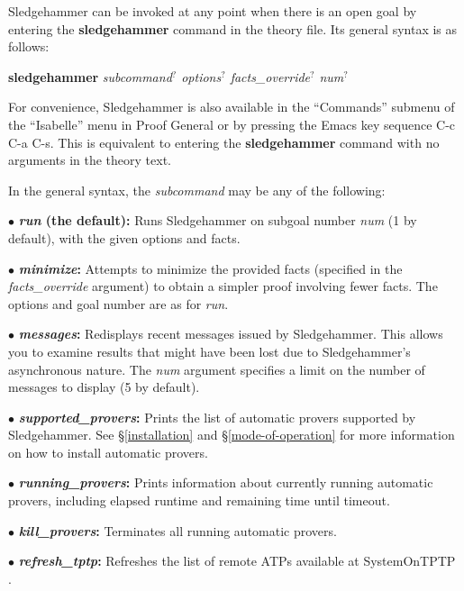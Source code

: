 \documentclass[a4paper,12pt]{article}
\begin{document}
Sledgehammer can be invoked at any point when there is an open goal by entering
the \textbf{sledgehammer} command in the theory file. Its general syntax is as
follows:

\prew
\textbf{sledgehammer} \textit{subcommand\/$^?$ options\/$^?$ facts\_override\/$^?$ num\/$^?$}
\postw

For convenience, Sledgehammer is also available in the ``Commands'' submenu of
the ``Isabelle'' menu in Proof General or by pressing the Emacs key sequence C-c
C-a C-s. This is equivalent to entering the \textbf{sledgehammer} command with
no arguments in the theory text.

In the general syntax, the \textit{subcommand} may be any of the following:

\begin{enum}
\item[$\bullet$] \textbf{\textit{run} (the default):} Runs Sledgehammer on
subgoal number \textit{num} (1 by default), with the given options and facts.

\item[$\bullet$] \textbf{\textit{minimize}:} Attempts to minimize the provided facts
(specified in the \textit{facts\_override} argument) to obtain a simpler proof
involving fewer facts. The options and goal number are as for \textit{run}.

\item[$\bullet$] \textbf{\textit{messages}:} Redisplays recent messages issued
by Sledgehammer. This allows you to examine results that might have been lost
due to Sledgehammer's asynchronous nature. The \textit{num} argument specifies a
limit on the number of messages to display (5 by default).

\item[$\bullet$] \textbf{\textit{supported\_provers}:} Prints the list of
automatic provers supported by Sledgehammer. See \S\ref{installation} and
\S\ref{mode-of-operation} for more information on how to install automatic
provers.

\item[$\bullet$] \textbf{\textit{running\_provers}:} Prints information about
currently running automatic provers, including elapsed runtime and remaining
time until timeout.

\item[$\bullet$] \textbf{\textit{kill\_provers}:} Terminates all running
automatic provers.

\item[$\bullet$] \textbf{\textit{refresh\_tptp}:} Refreshes the list of remote
ATPs available at System\-On\-TPTP \cite{sutcliffe-2000}.
\end{enum}
\end{document}
